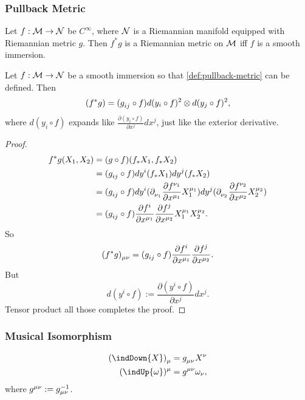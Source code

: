 \documentclass[../main.tex]{subfiles}
\begin{document}
    \subsubsection{Pullback Metric}
    \begin{definition}\label{def:pullback-metric}
        Let \(f : \manifold[M] \to \manifold[N]\) be \(C^\infty\), where 
        \(\manifold[N]\) is a Riemannian manifold equipped with Riemannian metric 
        \(g\). Then \(f^*g\) is a Riemannian metric on \(\manifold[M]\) iff \(f\) 
        is a smooth immersion.
    \end{definition}
    \begin{theorem}\label{thm:mnemonic-pullback-metric}
        Let \(f : \manifold[M] \to \manifold[N]\) be a smooth immersion so that 
        \cref{def:pullback-metric} can be defined. Then 
        \[
        (f^*g)=(g\indices{_i_j}\circ f)d(y_i\circ f)^2\otimes d(y_j\circ f)^2,
        \]
        where \(d(y_i \circ f)\) expands like \(\frac{\partial (y_i\circ f)}
        {\partial x^j}dx^j\), just like the exterior derivative.
    \end{theorem}
    \begin{proof}
        \[
        \begin{aligned}
            f^*g(X_1, X_2)&=(g\circ f)(f_*X_1, f_*X_2) \\
            &=(g\indices{_i_j}\circ f)dy^i(f_*X_1)dy^j(f_*X_2) \\
            &=(g\indices{_i_j}\circ f)dy^i(\tfld{\nu_1}\frac{\partial f^{\nu_1}}
            {\partial x^{\mu_1}}X_1^{\mu_1})dy^j(\tfld{\nu_2}\frac{\partial f^{\nu_2}}
            {\partial x^{\mu_2}}X_2^{\mu_2}) \\
            &=(g\indices{_i_j}\circ f)\frac{\partial f^i}{\partial x^{\mu_1}}
            \frac{\partial f^j}{\partial x^{\mu_2}}X_1^{\mu_1}X_2^{\mu_2}.
        \end{aligned}
        \]
        So 
        \[
        (f^*g)\indices{_\mu_\nu}=(g\indices{_i_j}\circ f)\frac{\partial f^i}
        {\partial x^{\mu_1}}\frac{\partial f^j}{\partial x^{\mu_2}}.
        \]
        But 
        \[
        d(y^i\circ f) := \frac{\partial (y^i\circ f)}{\partial x^j}dx^j.
        \]
        Tensor product all those completes the proof.
    \end{proof}
    \subsubsection{Musical Isomorphism}
    \begin{definition}\label{def:musical-isomorphism}
        \[
        \begin{aligned}
            (\indDown{X})\indices{_\mu}&=g\indices{_\mu_\nu}X^\nu \\
            (\indUp{\omega})\indices{^\mu}&=g\indices{^\mu^\nu}\omega_\nu,
        \end{aligned}
        \]
        where \(g\indices{^\mu^\nu}:=g ^{-1}_{\mu\nu}\).
    \end{definition}
\end{document}

